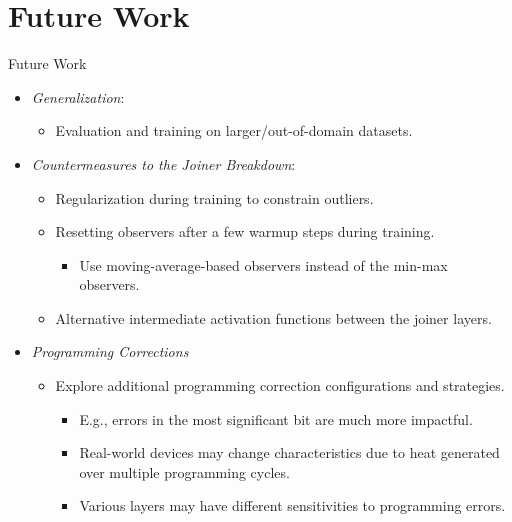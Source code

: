 \documentclass[xcolor=table,mathserif,9pt,usepdftitle=false]{beamer}    %
\begin{document}

\section{Future Work}

\begin{frame}{Future Work}
  \begin{itemize}
    \setlength{\itemsep}{10pt}
    \item \emph{Generalization}:
          \begin{itemize}
            \item Evaluation and training on larger/out-of-domain datasets.
          \end{itemize}
    \item \emph{Countermeasures to the Joiner Breakdown}:
          \begin{itemize}
            \item Regularization during training to constrain outliers.
            \item Resetting observers after a few warmup steps during training.
                  \begin{itemize}
                    \item [$\rightarrow$] Use moving-average-based observers instead of the min-max observers.
                  \end{itemize}
            \item Alternative intermediate activation functions between the joiner layers.
          \end{itemize}
    \item \emph{Programming Corrections}
          \begin{itemize}
            \item Explore additional programming correction configurations and strategies.
                  \begin{itemize}
                    \item[$\rightarrow$] E.g., errors in the most significant bit are much more impactful.
                    \item[$\rightarrow$] Real-world devices may change characteristics due to heat generated over multiple programming cycles.
                    \item[$\rightarrow$] Various layers may have different sensitivities to programming errors.
                  \end{itemize}
          \end{itemize}

  \end{itemize}
\end{frame}
\end{document}

